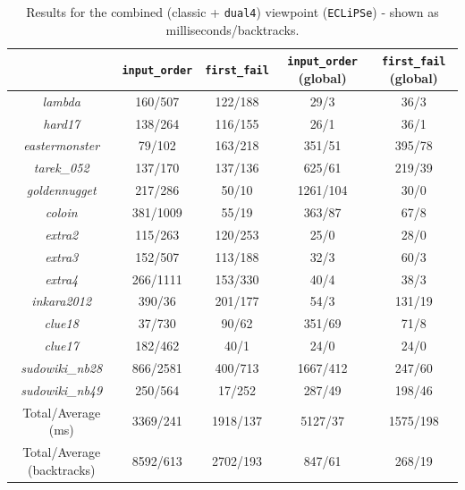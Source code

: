 \begin{table}[H]
\centering
\footnotesize
\bgroup
\def\arraystretch{1.3}
\begin{tabular}{ccc|cc}
\multicolumn{1}{l}{}    & \texttt{input\_order} & \texttt{first\_fail} & \texttt{input\_order} (global) & \texttt{first\_fail} (global) \\ \hline
\textit{lambda} & 160/507 & 122/188 & 29/3 & 36/3 \\
\textit{hard17}  & 138/264 & 116/155 & 26/1 & 36/1 \\
\textit{eastermonster} & 79/102 & 163/218 & 351/51 & 395/78 \\
\textit{tarek\_052} & 137/170 & 137/136 & 625/61 & 219/39 \\
\textit{goldennugget} & 217/286 & 50/10 & 1261/104 & 30/0 \\
\textit{coloin} & 381/1009 & 55/19 & 363/87 & 67/8 \\
\textit{extra2} & 115/263 & 120/253 & 25/0 & 28/0 \\
\textit{extra3} & 152/507 & 113/188 & 32/3 & 60/3 \\
\textit{extra4} & 266/1111 & 153/330 & 40/4 & 38/3 \\
\textit{inkara2012} & 390/36 & 201/177 & 54/3 & 131/19 \\
\textit{clue18} & 37/730 & 90/62 & 351/69 & 71/8 \\
\textit{clue17} & 182/462 & 40/1 & 24/0 & 24/0 \\
\textit{sudowiki\_nb28} & 866/2581 & 400/713 & 1667/412 & 247/60 \\
\textit{sudowiki\_nb49} & 250/564 & 17/252 & 287/49 & 198/46 \\\hline
Total/Average (ms) & 3369/241 & 1918/137 & 5127/37 & 1575/198 \\
Total/Average (backtracks) & 8592/613 & 2702/193 & 847/61 & 268/19
\end{tabular}
\egroup
\caption{Results for the combined (classic + \texttt{dual4}) viewpoint (\texttt{ECLiPSe}) - shown as milliseconds/backtracks.}
\label{tab:res3}
\end{table}

